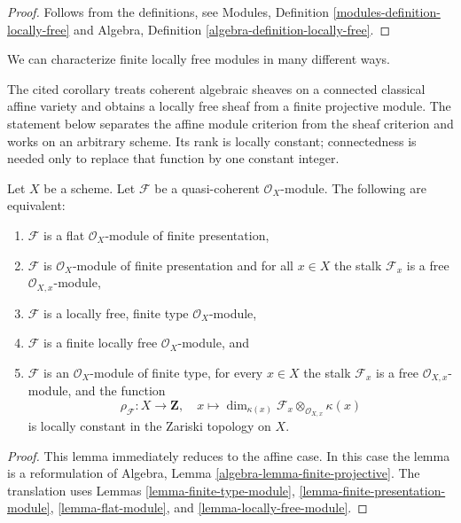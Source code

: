 \begin{proof}
Follows from the definitions, see
Modules, Definition \ref{modules-definition-locally-free}
and
Algebra, Definition \ref{algebra-definition-locally-free}.
\end{proof}

\noindent
We can characterize finite locally free modules in many different ways.

\begin{lemma}
\label{lemma-finite-locally-free}
\begin{reference}
\cite[Chapter II, \S 4, no. 50, Corollary, pp. 242--243]{FAC}
\end{reference}
\begin{history}
The cited corollary treats coherent algebraic sheaves on a connected
classical affine variety and obtains a locally free sheaf from a finite
projective module. The statement below separates the affine module criterion
from the sheaf criterion and works on an arbitrary scheme. Its rank is
locally constant; connectedness is needed only to replace that function by
one constant integer.
\end{history}
Let $X$ be a scheme.
Let $\mathcal{F}$ be a quasi-coherent $\mathcal{O}_X$-module.
The following are equivalent:
\begin{enumerate}
\item $\mathcal{F}$ is a flat $\mathcal{O}_X$-module of finite presentation,
\item $\mathcal{F}$ is $\mathcal{O}_X$-module of finite presentation and
for all $x \in X$ the stalk $\mathcal{F}_x$ is a free
$\mathcal{O}_{X, x}$-module,
\item $\mathcal{F}$ is a locally free, finite type $\mathcal{O}_X$-module,
\item $\mathcal{F}$ is a finite locally free $\mathcal{O}_X$-module, and
\item $\mathcal{F}$ is an $\mathcal{O}_X$-module of finite type,
for every $x \in X$ the stalk $\mathcal{F}_x$ is a free
$\mathcal{O}_{X, x}$-module, and the function
$$
\rho_\mathcal{F} : X \to \mathbf{Z}, \quad
x \longmapsto
\dim_{\kappa(x)} \mathcal{F}_x \otimes_{\mathcal{O}_{X, x}} \kappa(x)
$$
is locally constant in the Zariski topology on $X$.
\end{enumerate}
\end{lemma}

\begin{proof}
This lemma immediately reduces to the affine case.
In this case the lemma is a reformulation of
Algebra, Lemma \ref{algebra-lemma-finite-projective}.
The translation uses
Lemmas \ref{lemma-finite-type-module},
\ref{lemma-finite-presentation-module},
\ref{lemma-flat-module}, and
\ref{lemma-locally-free-module}.
\end{proof}

